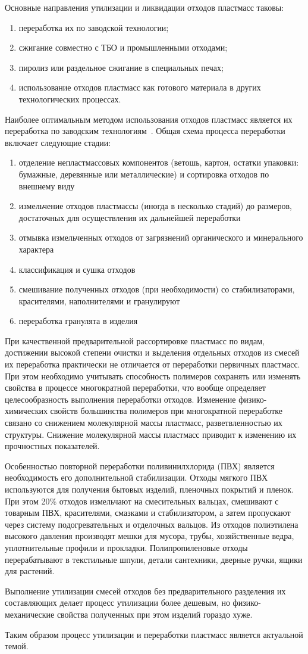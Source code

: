Основные направления утилизации и ликвидации отходов пластмасс таковы:
\begin{enumerate}
\item переработка их по заводской технологии;
\item сжигание совместно с ТБО и промышленными отходами;
\item пиролиз или раздельное сжигание в специальных печах;
\item использование отходов пластмасс как готового материала в других технологических процессах.
\end{enumerate}

Наиболее оптимальным методом использования отходов пластмасс является их
переработка по заводским технологиям~\cite{utilization}. Общая схема процесса переработки
включает следующие стадии:
\begin{enumerate}[1.]
\item отделение непластмассовых компонентов (ветошь, картон, остатки упаковки:
	бумажные, деревянные или металлические) и сортировка отходов по внешнему виду
\item измельчение отходов пластмассы (иногда в несколько стадий) до размеров,
	достаточных для осуществления их дальнейшей переработки
\item отмывка измельченных отходов от загрязнений органического и минерального
	характера
\item классификация и сушка отходов
\item смешивание полученных отходов (при необходимости) со стабилизаторами,
	красителями, наполнителями и гранулируют
\item переработка гранулята в изделия
\end{enumerate}

При качественной предварительной рассортировке пластмасс по видам, достижении высокой
степени очистки и выделения отдельных отходов из смесей их переработка практически не
отличается от переработки первичных пластмасс. При этом необходимо учитывать способность
полимеров сохранять или изменять свойства в процессе многократной переработки, что
вообще определяет целесообразность выполнения переработки отходов. Изменение физико-химических
свойств большинства полимеров при многократной переработке связано со снижением молекулярной
массы пластмасс, разветвленностью их структуры. Снижение молекулярной массы пластмасс
приводит к изменению их прочностных показателей.

Особенностью повторной переработки поливинилхлорида (ПВХ) является необходимость
его дополнительной стабилизации. Отходы мягкого ПВХ используются для получения
бытовых изделий, пленочных покрытий и пленок. При этом 20\% отходов измельчают
на смесительных вальцах, смешивают с товарным ПВХ, красителями, смазками и
стабилизатором, а затем пропускают через систему подогревательных и отделочных
вальцов. Из отходов полиэтилена высокого давления производят мешки для мусора,
трубы, хозяйственные ведра, уплотнительные профили и прокладки. Полипропиленовые
отходы перерабатывают в текстильные шпули, детали сантехники, дверные ручки, ящики для растений.

Выполнение утилизации смесей отходов без предварительного разделения их
составляющих делает процесс утилизации более дешевым, но физико-механические
свойства полученных при этом изделий гораздо хуже.

Таким образом процесс утилизации и переработки пластмасс является актуальной темой.
